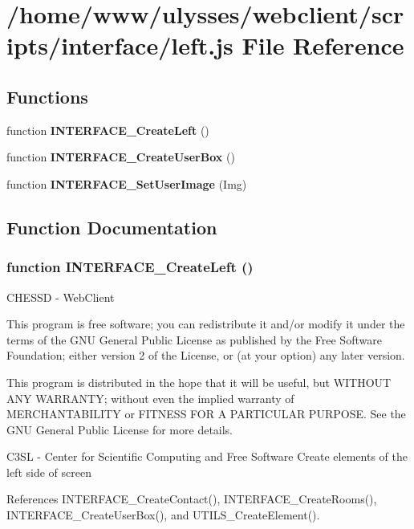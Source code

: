 \section{/home/www/ulysses/webclient/scripts/interface/left.js File Reference}
\label{left_8js}
\subsection*{Functions}
\begin{CompactItemize}
\item 
function {\bf INTERFACE\_\-CreateLeft} ()
\item 
function {\bf INTERFACE\_\-CreateUserBox} ()
\item 
function {\bf INTERFACE\_\-SetUserImage} (Img)
\end{CompactItemize}


\subsection{Function Documentation}
\subsubsection{\setlength{\rightskip}{0pt plus 5cm}function INTERFACE\_\-CreateLeft ()}\label{left_8js_6773b1f1613b8bf92b8443e4451130d8}


CHESSD - WebClient

This program is free software; you can redistribute it and/or modify it under the terms of the GNU General Public License as published by the Free Software Foundation; either version 2 of the License, or (at your option) any later version.

This program is distributed in the hope that it will be useful, but WITHOUT ANY WARRANTY; without even the implied warranty of MERCHANTABILITY or FITNESS FOR A PARTICULAR PURPOSE. See the GNU General Public License for more details.

C3SL - Center for Scientific Computing and Free Software Create elements of the left side of screen 

References INTERFACE\_\-CreateContact(), INTERFACE\_\-CreateRooms(), INTERFACE\_\-CreateUserBox(), and UTILS\_\-CreateElement().

